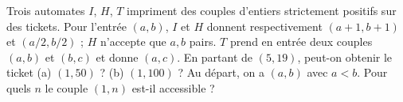 Trois automates $I$, $H$, $T$ impriment des couples d'entiers strictement positifs sur des tickets. Pour l'entrée $(a, b)$, $I$ et $H$ donnent respectivement $(a + 1, b + 1)$ et $(a/2, b/2)$ ; $H$ n'accepte que $a, b$ pairs. $T$ prend en entrée deux couples $(a, b)$ et $(b, c)$ et donne $(a, c)$. En partant de $(5, 19)$, peut-on obtenir le ticket (a) $(1, 50)$ ? (b) $(1, 100)$ ? Au départ, on a $(a, b)$ avec $a < b$. Pour quels $n$ le couple $(1, n)$ est-il accessible ?
